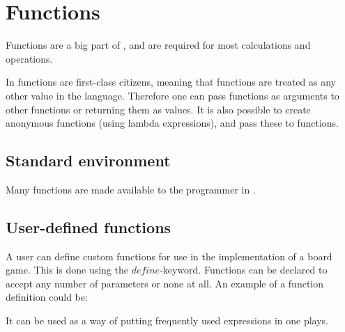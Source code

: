 \section{Functions}

Functions are a big part of \productname, and are required for most calculations and operations.

In \productname functions are first-class citizens, meaning that functions are treated
as any other value in the language. Therefore one can pass functions as
arguments to other functions or returning them as values. It is also possible to create
anonymous functions (using lambda expressions), and pass these to functions.

\subsection{Standard environment}

Many functions are made available to the programmer in \productname.

\subsection{User-defined functions}

A user can define custom functions for use in the implementation of a board game.
This is done using the $define$-keyword. Functions can be declared to accept
any number of parameters or none at all. An example of a function definition could
be:


It can be used as a way of putting frequently used expressions in one plays. 
